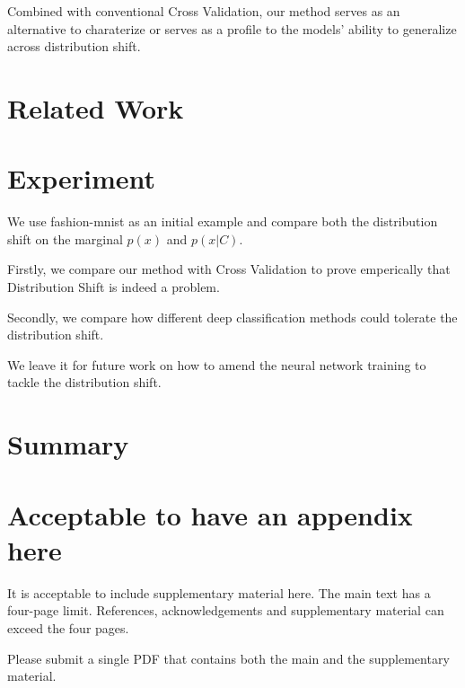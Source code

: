 \documentclass{article}
\begin{document}
Combined with conventional Cross Validation, our method serves as an alternative to charaterize or serves as a profile to the models' ability to generalize across distribution shift.
 
\section{Related Work}
\section{Experiment}
We use fashion-mnist \cite{FIXME} as an initial example and compare both the distribution shift on the marginal $p(x)$ and $p(x|C)$. 

Firstly, we compare our method with Cross Validation to prove emperically that Distribution Shift is indeed  a problem.

Secondly, we compare how different deep classification methods could tolerate the distribution shift.

We leave it for future work on how to amend the neural network training to tackle the distribution shift.
\section{Summary}




\appendix
\section{Acceptable to have an appendix here}
It is acceptable to include supplementary material here. 
The main text has a four-page limit. References, acknowledgements and supplementary material can exceed the four pages. 

Please submit a single PDF that contains both the main and the supplementary material. 
\end{document}
